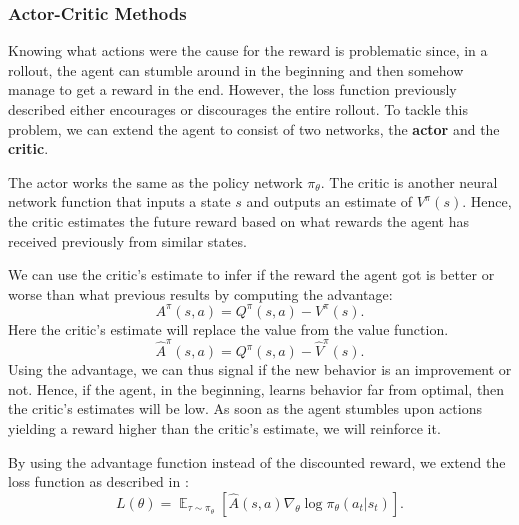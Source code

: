 \documentclass[12pt,A4]{report}
\theoremstyle{definition}
\begin{document}

\subsubsection{Actor-Critic Methods}
Knowing what actions were the cause for the reward is problematic since, in a rollout, the agent can stumble around in the beginning and then somehow manage to get a reward in the end. However, the loss function previously described either encourages or discourages the entire rollout. To tackle this problem, we can extend the agent to consist of two networks, the \textbf{actor} and the \textbf{critic}. 

The actor works the same as the policy network $\pi_\theta$. The critic is another neural network function that inputs a state $s$ and outputs an estimate of $V^\pi(s)$. Hence, the critic estimates the future reward based on what rewards the agent has received previously from similar states.


We can use the critic's estimate to infer if the reward the agent got is better or worse than what previous results by computing the advantage:
\[A^\pi(s,a) = Q^\pi(s, a) - V^\pi(s).\]
Here the critic's estimate will replace the value from the value function.
\[\hat{A}^\pi(s,a) = Q^\pi(s, a) - \hat{V}^\pi(s).\]
Using the advantage, we can thus signal if the new behavior is an improvement or not. Hence, if the agent, in the beginning, learns behavior far from optimal, then the critic's estimates will be low. As soon as the agent stumbles upon actions yielding a reward higher than the critic's estimate, we will reinforce it. 

By using the advantage function instead of the discounted reward, we extend the loss function as described in \citet{OpenAI}:
\[ L(\theta) = \mathop{\mathbb{E}}_{\tau \sim \pi_\theta} [\hat{A}(s,a) \nabla_\theta \log \pi_\theta (a_t|s_t) ]. \]
\end{document}
